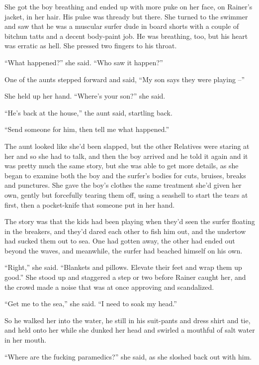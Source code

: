 \tb

She got the boy breathing and ended up with more puke on her face, on 
Rainer's jacket, in her hair. His pulse was thready but there. She 
turned to the swimmer and saw that he was a muscular surfer dude in 
board shorts with a couple of bitchun tatts and a decent body-paint 
job. He was breathing, too, but his heart was erratic as hell. She 
pressed two fingers to his throat.

“What happened?” she said. “Who saw it happen?”

One of the aunts stepped forward and said, “My son says they were 
playing --”

She held up her hand. “Where's your son?” she said.

“He's back at the house,” the aunt said, startling back.

“Send someone for him, then tell me what happened.”

The aunt looked like she'd been slapped, but the other Relatives were 
staring at her and so she had to talk, and then the boy arrived and he 
told it again and it was pretty much the same story, but she was able 
to get more details, as she began to examine both the boy and the 
surfer's bodies for cuts, bruises, breaks and punctures. She gave the 
boy's clothes the same treatment she'd given her own, gently but 
forcefully tearing them off, using a seashell to start the tears at 
first, then a pocket-knife that someone put in her hand.

The story was that the kids had been playing when they'd seen the 
surfer floating in the breakers, and they'd dared each other to fish 
him out, and the undertow had sucked them out to sea. One had gotten 
away, the other had ended out beyond the waves, and meanwhile, the 
surfer had beached himself on his own.

“Right,” she said. “Blankets and pillows. Elevate their feet and 
wrap them up good.” She stood up and staggered a step or two before 
Rainer caught her, and the crowd made a noise that was at once 
approving and scandalized.

“Get me to the sea,” she said. “I need to soak my head.”

So he walked her into the water, he still in his suit-pants and dress 
shirt and tie, and held onto her while she dunked her head and swirled 
a mouthful of salt water in her mouth.

“Where are the fucking paramedics?” she said, as she sloshed back 
out with him.

